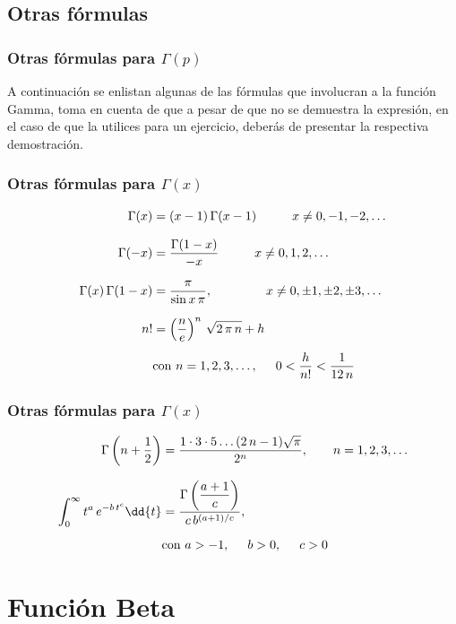 \subsection{Otras fórmulas}
\begin{frame}
\frametitle{Otras fórmulas para $\Gamma(p)$}
A continuación se enlistan algunas de las fórmulas que involucran a la función Gamma, toma en cuenta de que a pesar de que no se demuestra la expresión, en el caso de que la utilices para un ejercicio, deberás de presentar la respectiva demostración.
\end{frame}
\begin{frame}
\frametitle{Otras fórmulas para $\Gamma(x)$}
\fontsize{12}{12}\selectfont
\begin{align*}
\Gamma (x) &= (x - 1) \, \Gamma(x - 1) \hspace{1cm} x \neq 0, -1, -2, \ldots \\[0.75em]
\Gamma (-x) &= \dfrac{\Gamma (1- x)}{-x} \hspace{1cm} x \neq 0, 1, 2, \ldots \\[0.75em]
\Gamma (x) \, \Gamma (1 - x) &= \dfrac{\pi}{\sin x \, \pi}, \hspace{1.5cm} x \neq 0, \pm 1, \pm 2, \pm 3, \ldots \\[0.75em]
n! &= \left( \dfrac{n}{e} \right)^{n} \, \sqrt{2 \, \pi \, n} + h \\[0.5em]
&\mbox{con } n = 1, 2, 3, \ldots, \hspace{0.5cm} 0 < \dfrac{h}{n!} < \dfrac{1}{12 \, n}
\end{align*}
\end{frame}
\begin{frame}
\frametitle{Otras fórmulas para $\Gamma(x)$}
\fontsize{12}{12}\selectfont
\begin{align*}
\Gamma \left(n + \dfrac{1}{2} \right) &= \dfrac{1 \cdot 3 \cdot 5 \ldots (2 \, n - 1)\sqrt{\pi}}{2^{n}}, \hspace{0.7cm} n = 1, 2, 3, \ldots \\[0.75em]
\int_{0}^{\infty} t^{a} \, e^{-b \, t^{c}} \dd{t} &= \dfrac{\Gamma \left(\dfrac{a + 1}{c} \right)}{c \, b^{(a+1)/c}}, \\[0.5em]
&\mbox{con } a > -1, \hspace{0.5cm} b > 0, \hspace{0.5cm} c > 0   
\end{align*}
\end{frame}
\section{Función Beta}
